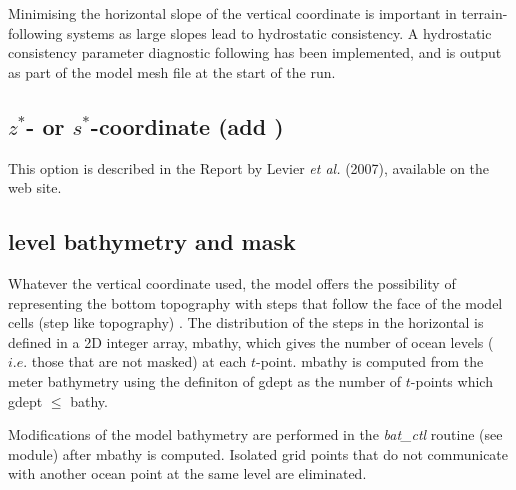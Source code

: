 \documentclass[NEMO_book]{subfiles}
\begin{document}
Minimising the horizontal slope of the vertical coordinate is important in terrain-following systems as large slopes lead to hydrostatic consistency. A hydrostatic consistency parameter diagnostic following \citet{Haney1991} has been implemented, and is output as part of the model mesh file at the start of the run.

\subsection{$z^*$- or $s^*$-coordinate (add ) }
\label{DOM_zgr_vvl}

This option is described in the Report by Levier \textit{et al.} (2007), available on 
the \NEMO web site. 


\subsection{level bathymetry and mask}
\label{DOM_msk}

Whatever the vertical coordinate used, the model offers the possibility of 
representing the bottom topography with steps that follow the face of the 
model cells (step like topography) \citep{Madec_al_JPO96}. The distribution of 
the steps in the horizontal is defined in a 2D integer array, mbathy, which 
gives the number of ocean levels ($i.e.$ those that are not masked) at each 
$t$-point. mbathy is computed from the meter bathymetry using the definiton of 
gdept as the number of $t$-points which gdept $\leq$ bathy.

Modifications of the model bathymetry are performed in the \textit{bat\_ctl} 
routine (see  module) after mbathy is computed. Isolated grid points 
that do not communicate with another ocean point at the same level are eliminated.\\
\end{document}

